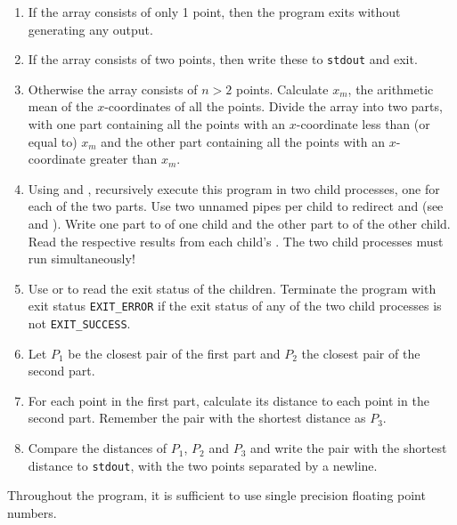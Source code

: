 \begin{enumerate}
\item If the array consists of only 1 point, then the program exits without generating any output.

\item If the array consists of two points, then write these to \texttt{stdout} and exit.

\item Otherwise the array consists of $n>2$ points.
Calculate $x_m$, the arithmetic mean of the $x$-coordinates of all the points.
Divide the array into two parts,
with one part containing all the points
with an $x$-coordinate less than (or equal to) $x_m$
and the other part containing all the points
with an $x$-coordinate greater than $x_m$.

\item Using  and ,
recursively execute this program in two child processes,
one for each of the two parts.
Use two unnamed pipes per child
to redirect  and 
(see  and ).
Write one part to  of one child
and the other part to  of the other child.
Read the respective results from each child's .
The two child processes must run simultaneously!

\item Use  or 
to read the exit status of the children.
Terminate the program with exit status \verb|EXIT_ERROR|
if the exit status of any of the two child processes is not \verb|EXIT_SUCCESS|.

\item Let $P_1$ be the closest pair of the first part and $P_2$ the closest pair of the second part.

\item For each point in the first part,
calculate its distance to each point in the second part.
Remember the pair with the shortest distance as $P_3$.

\item Compare the distances of $P_1$, $P_2$ and $P_3$
and write the pair with the shortest distance to \texttt{stdout},
with the two points separated by a newline.
\end{enumerate}

Throughout the program,
it is sufficient to use single precision floating point numbers.

\clearpage
